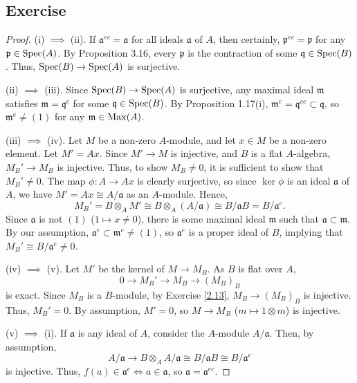 \subsection{Exercise}\label{3.16}

\begin{proof}
(i) $\implies$ (ii). If $\mathfrak{a}^{ec} = \mathfrak{a}$ for all ideals $\mathfrak{a}$ of $A$, then certainly, $\mathfrak{p}^{ec} = \mathfrak{p}$ for any $\mathfrak{p} \in \operatorname{Spec}(A)$. By
Proposition 3.16, every $\mathfrak{p}$ is the contraction of some $\mathfrak{q} \in \operatorname{Spec}(B)$. Thus, $\operatorname{Spec}(B) \to \operatorname{Spec}(A)$ is surjective.

(ii) $\implies$ (iii). Since $\operatorname{Spec}(B) \to \operatorname{Spec}(A)$ is surjective, any maximal ideal $\mathfrak{m}$ satisfies $\mathfrak{m} = \mathfrak{q}^c$ for some $\mathfrak{q} \in \operatorname{Spec}(B)$. By Proposition 1.17(i),
$\mathfrak{m}^e = \mathfrak{q}^{ce} \subset \mathfrak{q}$, so $\mathfrak{m}^e \neq (1)$ for any $\mathfrak{m} \in \operatorname{Max}(A)$.

(iii) $\implies$ (iv). Let $M$ be a non-zero $A$-module, and let $x \in M$ be a non-zero element. Let $M' = Ax$. Since $M' \to M$ is injective, and $B$ is a flat $A$-algebra,
$M_B' \to M_B$ is injective. Thus, to show $M_B \neq 0$, it is sufficient to show that $M_B' \neq 0$. The map $\phi : A \to Ax$ is clearly surjective, so since $\ker \phi$ is an ideal
$\mathfrak{a}$ of $A$, we have $M' = Ax \cong A/\mathfrak{a}$ as an $A$-module. Hence,
$$M_B' = B \otimes_A M' \cong B \otimes_A (A/\mathfrak{a}) \cong B / \mathfrak{a}B = B / \mathfrak{a}^e.$$
Since $\mathfrak{a}$ is not $(1)$ ($1 \mapsto x \neq 0$), there is some maximal ideal $\mathfrak{m}$ such that $\mathfrak{a} \subset \mathfrak{m}$. By our assumption, $\mathfrak{a}^e \subset \mathfrak{m}^e \neq (1)$,
so $\mathfrak{a}^e$ is a proper ideal of $B$, implying that $M_B' \cong B/\mathfrak{a}^e \neq 0$.

(iv) $\implies$ (v). Let $M'$ be the kernel of $M \to M_B$. As $B$ is flat over $A$,
$$0 \to M_B' \to M_B \to (M_B)_B$$
is exact. Since $M_B$ is a $B$-module, by Exercise \ref{2.13}, $M_B \to (M_B)_B$ is injective. Thus, $M_B' = 0$. By assumption, $M' = 0$, so $M \to M_B$ ($m \mapsto 1\otimes m$) is injective.

(v) $\implies$ (i). If $\mathfrak{a}$ is any ideal of $A$, consider the $A$-module $A/\mathfrak{a}$. Then, by assumption,
$$A/\mathfrak{a} \to B \otimes_A A/\mathfrak{a} \cong B/\mathfrak{a}B \cong B/\mathfrak{a}^e$$
is injective. Thus, $f(a) \in \mathfrak{a}^e \iff a \in \mathfrak{a}$, so $\mathfrak{a} = \mathfrak{a}^{ec}$.
\end{proof}

